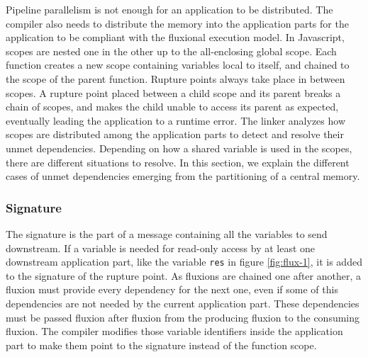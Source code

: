 
Pipeline parallelism is not enough for an application to be distributed.
The compiler also needs to distribute the memory into the application parts for the application to be compliant with the fluxional execution model.
In Javascript, scopes are nested one in the other up to the all-enclosing global scope.
Each function creates a new scope containing variables local to itself, and chained to the scope of the parent function.
Rupture points always take place in between scopes.
A rupture point placed between a child scope and its parent breaks a chain of scopes, and makes the child unable to access its parent as expected, eventually leading the application to a runtime error.
The linker analyzes how scopes are distributed among the application parts to detect and resolve their unmet dependencies.
Depending on how a shared variable is used in the scopes, there are different situations to resolve.
In this section, we explain the different cases of unmet dependencies emerging from the partitioning of a central memory.

\subsubsection{Signature}

The signature is the part of a message containing all the variables to send downstream.
If a variable is needed for read-only access by at least one downstream application part, like the variable \texttt{res} in figure \ref{fig:flux-1}, it is added to the signature of the rupture point.
As fluxions are chained one after another, a fluxion must provide every dependency for the next one, even if some of this dependencies are not needed by the current application part.
These dependencies must be passed fluxion after fluxion from the producing fluxion to the consuming fluxion.
The compiler modifies those variable identifiers inside the application part to make them point to the signature instead of the function scope.

